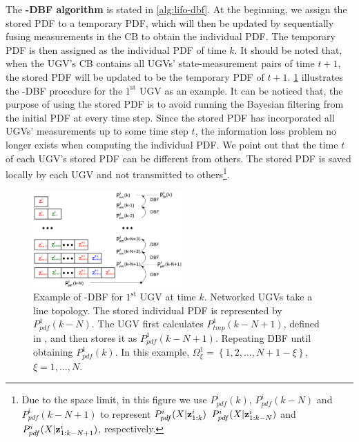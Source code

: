 	The \textbf{\proto-DBF algorithm} is stated in \cref{alg:lifo-dbf}.
	At the beginning, we assign the stored PDF to a temporary PDF, which will then be updated by sequentially fusing measurements in the CB to obtain the individual PDF.
	The temporary PDF is then assigned as the individual PDF of time $k$.
	It should be noted that, when the UGV's CB contains all UGVs' state-measurement pairs of time $t+1$, the stored PDF will be updated to be the temporary PDF of $t+1$.
	\cref{fig:LIFO-DBF} illustrates the \proto-DBF procedure for the $1^\text{st}$ UGV as an example.
	It can be noticed that, the purpose of using the stored PDF is to avoid running the Bayesian filtering from the initial PDF at every time step. 
	Since the stored PDF has incorporated all UGVs' measurements up to some time step $t$, the information loss problem no longer exists when computing the individual PDF.
	We point out that the time $t$ of each UGV's stored PDF can be different from others.
	The stored PDF is saved locally by each UGV and not transmitted to others\footnote{ Due to the space limit, in this figure we use $P^i_{pdf}(k)$, $P^i_{pdf}(k-N)$ and $P^i_{pdf}(k-N+1)$ to represent $P^i_{pdf}(X|\mathbf{z}^{i}_{1:k})$ $P^i_{pdf}(X|\mathbf{z}^{i}_{1:k-N})$ and $P^i_{pdf}(X|\mathbf{z}^{i}_{1:k-N+1})$, respectively.}.
	
	\begin{figure}%
		\centering
		\includegraphics[width=0.51\textwidth]{figures/DBF_demo}
		\caption{Example of \proto-DBF for $1^\text{st}$ UGV at time $k$.
			Networked UGVs take a line topology.
			The stored individual PDF is represented by $ P^1_{pdf}(k-N)$.
			The UGV first calculates $ P^1_{tmp}(k-N+1)$, defined in , and then stores it as $ P^1_{pdf}(k-N+1)$. 
			Repeating DBF until obtaining $ P^1_{pdf}(k)$.
			In this example, $\Omega^1_{\xi}=\left\lbrace 1,2,\dots,N+1-\xi\right\rbrace $, $\xi=1,\dots,N$.}
		\label{fig:LIFO-DBF}
		\vspace{-1em}
	\end{figure}
	
